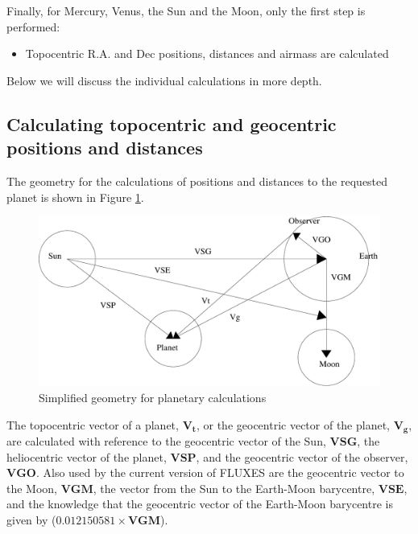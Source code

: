 \documentclass[11pt,twoside]{starlink}
\begin{document}
Finally, for Mercury, Venus, the Sun and the Moon, only the first step is performed:
\begin{itemize}
\item{Topocentric R.A. and Dec positions, distances and airmass are calculated}
\end{itemize}

Below we will discuss the individual calculations in more depth.

\subsection{Calculating topocentric and geocentric positions and distances}
\label{sec:positionsdistances}

The geometry for the calculations of positions and distances to the requested planet is shown in Figure \ref{fig:geom}.

\begin{figure}
\includegraphics[width=\textwidth]{sun213_fig2}
\vspace*{-0.5cm}
\caption{Simplified geometry for planetary calculations}
\label{fig:geom}
\end{figure}

The topocentric vector of a planet, $\boldsymbol{V_{t}}$, or the geocentric vector of the planet, $\boldsymbol{V_{g}}$, are calculated with reference to the geocentric vector of the Sun, $\boldsymbol{VSG}$, the heliocentric vector of the planet, $\boldsymbol{VSP}$, and the geocentric vector of the observer, $\boldsymbol{VGO}$.  Also used by the current version of FLUXES are the geocentric vector to the Moon, $\boldsymbol{VGM}$, the vector from the Sun to the Earth-Moon barycentre, $\boldsymbol{VSE}$, and the knowledge that the geocentric vector of the Earth-Moon barycentre is given by ($0.012150581 \times \boldsymbol{VGM}$).
\end{document}
